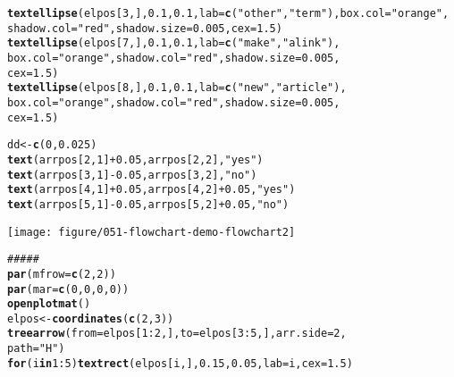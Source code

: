 \documentclass{article}\usepackage[]{graphicx}\usepackage[]{color}
\makeatletter
\def\maxwidth{ %
  \ifdim\Gin@nat@width>\linewidth
    \linewidth
  \else
    \Gin@nat@width
  \fi
}
\newcommand{\hlnum}[1]{\textcolor[rgb]{0.686,0.059,0.569}{#1}}%
\newcommand{\hlstr}[1]{\textcolor[rgb]{0.192,0.494,0.8}{#1}}%
\newcommand{\hlcom}[1]{\textcolor[rgb]{0.678,0.584,0.686}{\textit{#1}}}%
\newcommand{\hlopt}[1]{\textcolor[rgb]{0,0,0}{#1}}%
\newcommand{\hlstd}[1]{\textcolor[rgb]{0.345,0.345,0.345}{#1}}%
\newcommand{\hlkwa}[1]{\textcolor[rgb]{0.161,0.373,0.58}{\textbf{#1}}}%
\newcommand{\hlkwb}[1]{\textcolor[rgb]{0.69,0.353,0.396}{#1}}%
\newcommand{\hlkwc}[1]{\textcolor[rgb]{0.333,0.667,0.333}{#1}}%
\newcommand{\hlkwd}[1]{\textcolor[rgb]{0.737,0.353,0.396}{\textbf{#1}}}%
\newenvironment{kframe}{%
 \def\at@end@of@kframe{}%
 \ifinner\ifhmode%
  \def\at@end@of@kframe{\end{minipage}}%
  \begin{minipage}{\columnwidth}%
 \fi\fi%
 \def\FrameCommand##1{\hskip\@totalleftmargin \hskip-\fboxsep
 \colorbox{shadecolor}{##1}\hskip-\fboxsep
     \hskip-\linewidth \hskip-\@totalleftmargin \hskip\columnwidth}%
 \MakeFramed {\advance\hsize-\width
   \@totalleftmargin\z@ \linewidth\hsize
   \@setminipage}}%
 {\par\unskip\endMakeFramed%
 \at@end@of@kframe}
\newenvironment{knitrout}{}{} %
\makeatother
\begin{document}
\begin{knitrout}
\begin{kframe}
\begin{alltt}
\hlkwd{textellipse}\hlstd{(elpos[}\hlnum{3}\hlstd{, ],} \hlnum{0.1}\hlstd{,} \hlnum{0.1}\hlstd{,} \hlkwc{lab} \hlstd{=} \hlkwd{c}\hlstd{(}\hlstr{"other"}\hlstd{,} \hlstr{"term"}\hlstd{),} \hlkwc{box.col} \hlstd{=} \hlstr{"orange"}\hlstd{,}
    \hlkwc{shadow.col} \hlstd{=} \hlstr{"red"}\hlstd{,} \hlkwc{shadow.size} \hlstd{=} \hlnum{0.005}\hlstd{,} \hlkwc{cex} \hlstd{=} \hlnum{1.5}\hlstd{)}
\hlkwd{textellipse}\hlstd{(elpos[}\hlnum{7}\hlstd{, ],} \hlnum{0.1}\hlstd{,} \hlnum{0.1}\hlstd{,} \hlkwc{lab} \hlstd{=} \hlkwd{c}\hlstd{(}\hlstr{"make"}\hlstd{,} \hlstr{"a link"}\hlstd{),}
    \hlkwc{box.col} \hlstd{=} \hlstr{"orange"}\hlstd{,} \hlkwc{shadow.col} \hlstd{=} \hlstr{"red"}\hlstd{,} \hlkwc{shadow.size} \hlstd{=} \hlnum{0.005}\hlstd{,}
    \hlkwc{cex} \hlstd{=} \hlnum{1.5}\hlstd{)}
\hlkwd{textellipse}\hlstd{(elpos[}\hlnum{8}\hlstd{, ],} \hlnum{0.1}\hlstd{,} \hlnum{0.1}\hlstd{,} \hlkwc{lab} \hlstd{=} \hlkwd{c}\hlstd{(}\hlstr{"new"}\hlstd{,} \hlstr{"article"}\hlstd{),}
    \hlkwc{box.col} \hlstd{=} \hlstr{"orange"}\hlstd{,} \hlkwc{shadow.col} \hlstd{=} \hlstr{"red"}\hlstd{,} \hlkwc{shadow.size} \hlstd{=} \hlnum{0.005}\hlstd{,}
    \hlkwc{cex} \hlstd{=} \hlnum{1.5}\hlstd{)}

\hlstd{dd} \hlkwb{<-} \hlkwd{c}\hlstd{(}\hlnum{0}\hlstd{,} \hlnum{0.025}\hlstd{)}
\hlkwd{text}\hlstd{(arrpos[}\hlnum{2}\hlstd{,} \hlnum{1}\hlstd{]} \hlopt{+} \hlnum{0.05}\hlstd{, arrpos[}\hlnum{2}\hlstd{,} \hlnum{2}\hlstd{],} \hlstr{"yes"}\hlstd{)}
\hlkwd{text}\hlstd{(arrpos[}\hlnum{3}\hlstd{,} \hlnum{1}\hlstd{]} \hlopt{-} \hlnum{0.05}\hlstd{, arrpos[}\hlnum{3}\hlstd{,} \hlnum{2}\hlstd{],} \hlstr{"no"}\hlstd{)}
\hlkwd{text}\hlstd{(arrpos[}\hlnum{4}\hlstd{,} \hlnum{1}\hlstd{]} \hlopt{+} \hlnum{0.05}\hlstd{, arrpos[}\hlnum{4}\hlstd{,} \hlnum{2}\hlstd{]} \hlopt{+} \hlnum{0.05}\hlstd{,} \hlstr{"yes"}\hlstd{)}
\hlkwd{text}\hlstd{(arrpos[}\hlnum{5}\hlstd{,} \hlnum{1}\hlstd{]} \hlopt{-} \hlnum{0.05}\hlstd{, arrpos[}\hlnum{5}\hlstd{,} \hlnum{2}\hlstd{]} \hlopt{+} \hlnum{0.05}\hlstd{,} \hlstr{"no"}\hlstd{)}
\end{alltt}
\end{kframe}
\texttt{[image: figure/051-flowchart-demo-flowchart2]} 
\begin{kframe}\begin{alltt}
\hlcom{##### }
\hlkwd{par}\hlstd{(}\hlkwc{mfrow} \hlstd{=} \hlkwd{c}\hlstd{(}\hlnum{2}\hlstd{,} \hlnum{2}\hlstd{))}
\hlkwd{par}\hlstd{(}\hlkwc{mar} \hlstd{=} \hlkwd{c}\hlstd{(}\hlnum{0}\hlstd{,} \hlnum{0}\hlstd{,} \hlnum{0}\hlstd{,} \hlnum{0}\hlstd{))}
\hlkwd{openplotmat}\hlstd{()}
\hlstd{elpos} \hlkwb{<-} \hlkwd{coordinates}\hlstd{(}\hlkwd{c}\hlstd{(}\hlnum{2}\hlstd{,} \hlnum{3}\hlstd{))}
\hlkwd{treearrow}\hlstd{(}\hlkwc{from} \hlstd{= elpos[}\hlnum{1}\hlopt{:}\hlnum{2}\hlstd{, ],} \hlkwc{to} \hlstd{= elpos[}\hlnum{3}\hlopt{:}\hlnum{5}\hlstd{, ],} \hlkwc{arr.side} \hlstd{=} \hlnum{2}\hlstd{,}
    \hlkwc{path} \hlstd{=} \hlstr{"H"}\hlstd{)}
\hlkwa{for} \hlstd{(i} \hlkwa{in} \hlnum{1}\hlopt{:}\hlnum{5}\hlstd{)} \hlkwd{textrect}\hlstd{(elpos[i, ],} \hlnum{0.15}\hlstd{,} \hlnum{0.05}\hlstd{,} \hlkwc{lab} \hlstd{= i,} \hlkwc{cex} \hlstd{=} \hlnum{1.5}\hlstd{)}


\end{alltt}
\end{kframe}
\end{knitrout}
\end{document}
